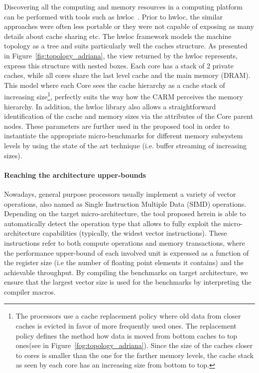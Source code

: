 \documentclass[twoside,twocolumn,8pt]{extarticle}
\begin{document}
Discovering all the computing and memory resources in a computing platform can be performed with tools such as
hwloc~\cite{goglin:hal-01330194}. Prior to hwloc,  the similar approaches were often less portable or they were not capable of
exposing as many details about cache sharing etc. The hwloc framework models the machine topology as a tree and suits particularly
well the caches structure.
As presented in Figure~\ref{fig:topology_adriana}, the view returned by the hwloc represents, express this structure with nested
boxes. Each core has a stack of 2 private caches, while all cores share the last level cache and the main memory (DRAM).
This model where each Core sees  the cache hierarchy as a cache stack of increasing size\footnote{
  The processors use a cache replacement policy where old data from closer caches is evicted in favor of more frequently used ones.
  The replacement policy defines the method how data is moved from bottom caches to top ones(see in
  Figure~\ref{fog:topology_adriana}). Since the size of the caches closer to cores is smaller than the one for the farther memory
  levels, the cache stack as seen by each core has an increasing size from bottom to top.
}, perfectly suits the way how the CARM perceives the memory hierarchy.
In addition, the hwloc library also allows a straightforward identification of the cache and memory sizes via the  attributes of
the Core parent nodes. These parameters are further used in the proposed tool  in order to instantiate the appropriate
micro-benchmarks for different memory subsystem levels by using the state of the art technique (i.e. buffer streaming of
increasing sizes).

\paragraph*{Reaching the architecture upper-bounds}

Nowadays, general purpose processors usually implement a variety of vector operations, also named as Single Instruction Multiple
Data (SIMD) operations. Depending on the target micro-architecture,  the tool proposed herein is able to automatically detect the
operation type that allows to fully exploit the micro-architecture capabilities  (typically, the widest vector instructions). These
instructions refer to both compute operations and memory transactions, where the performance upper-bound of each involved unit is
expressed as a function of the register size (i.e the number of floating point  elements it contains) and the achievable
throughput. By compiling the benchmarks on target architecture, we ensure that the largest vector size is used for the benchmarks
by interpreting the compiler macros. 
\end{document}
